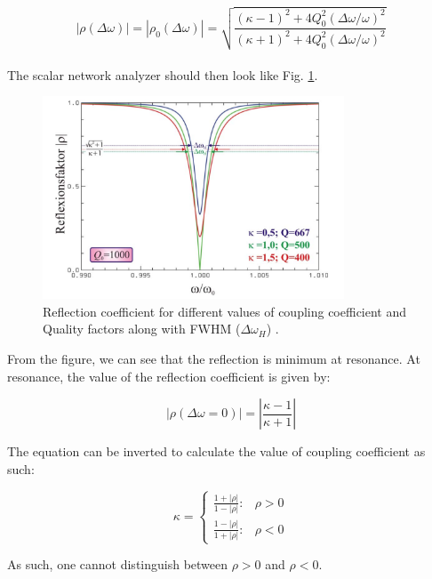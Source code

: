\documentclass[a4paper]{report}
\numberwithin{equation}{section}
\begin{document}
\begin{equation} \label{eqn:scalar}
			\left| \rho (\Delta \omega) \right| = \left| \rho_{0}(\Delta \omega) \right| = \sqrt{\frac{(\kappa - 1)^2 + 4Q_{0}^2 \left(\Delta \omega / \omega \right)^2}{(\kappa + 1)^2 + 4Q_{0}^2 \left(\Delta \omega / \omega \right)^2}} 
\end{equation}
\\
The scalar network analyzer should then look like Fig. \ref{fig:scalar}.

\begin{figure}[hbt!]
    \centering
    \includegraphics[width=0.8\textwidth]{scalar}
	\caption{Reflection coefficient for different values of coupling coefficient and Quality factors along with FWHM ($\Delta \omega_{H}$) \cite{Hillert}. }
    \label{fig:scalar}
\end{figure}

From the figure, we can see that the reflection is minimum at resonance. At resonance, the value of the reflection coefficient is given by:

\begin{equation}
		\left| \rho (\Delta \omega = 0) \right| = \left| \frac{\kappa - 1}{\kappa +1} \right| 
\end{equation}

The equation can be inverted to calculate the value of coupling coefficient as
such:

\begin{equation}
	\kappa = 
	\begin{cases}
		\frac{1 + |\rho|}{1 - |\rho|} :& \rho > 0\\
		\frac{1 - |\rho|}{1 + |\rho|} :& \rho < 0
	\end{cases}
	\label{eqn:kappa_rho}
\end{equation}

As such, one cannot distinguish between $\rho >0$ and $\rho<0$. 
\end{document}
